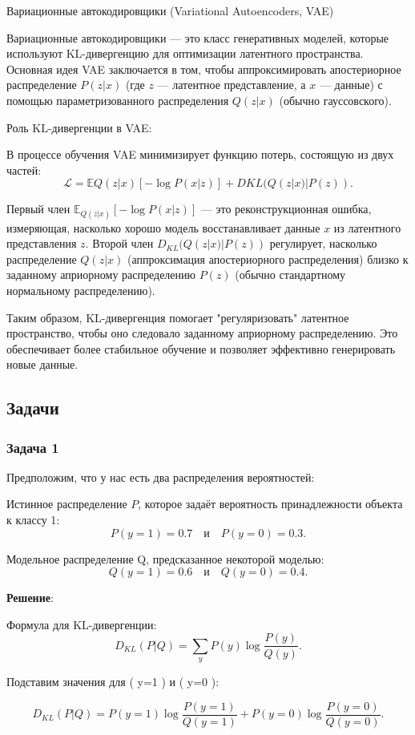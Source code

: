 Вариационные автокодировщики (Variational Autoencoders, VAE)

Вариационные автокодировщики — это класс генеративных моделей, которые используют KL-дивергенцию для оптимизации латентного пространства. Основная идея VAE заключается в том, чтобы аппроксимировать апостериорное распределение $ P(z|x) $ (где $ z $ — латентное представление, а $ x $ — данные) с помощью параметризованного распределения $Q(z|x)$ (обычно гауссовского).

Роль KL-дивергенции в VAE:

В процессе обучения VAE минимизирует функцию потерь, состоящую из двух частей:
\[
    \mathcal{L} = \mathbb{E}{Q(z|x)}[-\log P(x|z)] + D{KL}(Q(z|x) | P(z)).
\]

Первый член $\mathbb{E}_{Q(z|x)}[-\log P(x|z)]$ — это реконструкционная ошибка, измеряющая, насколько хорошо модель восстанавливает данные  $x$ из латентного представления $z$.
Второй член $D_{KL}(Q(z|x) | P(z))$ регулирует, насколько распределение $Q(z|x)$ (аппроксимация апостериорного распределения) близко к заданному априорному распределению $ P(z) $ (обычно стандартному нормальному распределению).

Таким образом, KL-дивергенция помогает "регуляризовать" латентное пространство, чтобы оно следовало заданному априорному распределению. Это обеспечивает более стабильное обучение и позволяет эффективно генерировать новые данные.

\subsection*{Задачи}
\subsubsection* {Задача 1}
Предположим, что у нас есть два распределения вероятностей:

Истинное распределение $P$, которое задаёт вероятность принадлежности объекта к классу 1:
\[
    P(y=1) = 0.7 \quad \text{и} \quad P(y=0) = 0.3.
\]

Модельное распределение Q, предсказанное некоторой моделью:
\[
    Q(y=1) = 0.6 \quad \text{и} \quad Q(y=0) = 0.4.
\]

\textbf{Решение}:

Формула для KL-дивергенции:
\[
    D_{KL}(P | Q) = \sum_{y} P(y) \log \frac{P(y)}{Q(y)}.
\]

Подставим значения для ( y=1 ) и ( y=0 ):

\[
    D_{KL}(P | Q) = P(y=1) \log \frac{P(y=1)}{Q(y=1)} + P(y=0) \log \frac{P(y=0)}{Q(y=0)}.
\]

